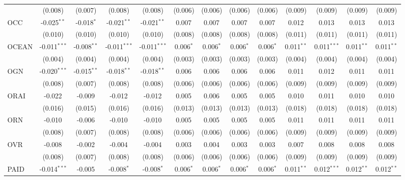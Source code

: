 \begin{table}[!htbp]
\begin{tabular}{@{\extracolsep{5pt}}lcccccccccccc}
  & (0.008) & (0.007) & (0.008) & (0.008) & (0.006) & (0.006) & (0.006) & (0.006) & (0.009) & (0.009) & (0.009) & (0.009) \\
 OCC & -0.025$^{**}$ & -0.018$^{*}$ & -0.021$^{**}$ & -0.021$^{**}$ & 0.007$^{}$ & 0.007$^{}$ & 0.007$^{}$ & 0.007$^{}$ & 0.012$^{}$ & 0.013$^{}$ & 0.013$^{}$ & 0.013$^{}$ \\
  & (0.010) & (0.010) & (0.010) & (0.010) & (0.008) & (0.008) & (0.008) & (0.008) & (0.011) & (0.011) & (0.011) & (0.011) \\
 OCEAN & -0.011$^{***}$ & -0.008$^{**}$ & -0.011$^{***}$ & -0.011$^{***}$ & 0.006$^{*}$ & 0.006$^{*}$ & 0.006$^{*}$ & 0.006$^{*}$ & 0.011$^{**}$ & 0.011$^{***}$ & 0.011$^{**}$ & 0.011$^{**}$ \\
  & (0.004) & (0.004) & (0.004) & (0.004) & (0.003) & (0.003) & (0.003) & (0.003) & (0.004) & (0.004) & (0.004) & (0.004) \\
 OGN & -0.020$^{***}$ & -0.015$^{**}$ & -0.018$^{**}$ & -0.018$^{**}$ & 0.006$^{}$ & 0.006$^{}$ & 0.006$^{}$ & 0.006$^{}$ & 0.011$^{}$ & 0.012$^{}$ & 0.011$^{}$ & 0.011$^{}$ \\
  & (0.008) & (0.007) & (0.008) & (0.008) & (0.006) & (0.006) & (0.006) & (0.006) & (0.009) & (0.009) & (0.009) & (0.009) \\
 ORAI & -0.022$^{}$ & -0.009$^{}$ & -0.012$^{}$ & -0.012$^{}$ & 0.005$^{}$ & 0.006$^{}$ & 0.005$^{}$ & 0.005$^{}$ & 0.010$^{}$ & 0.011$^{}$ & 0.010$^{}$ & 0.010$^{}$ \\
  & (0.016) & (0.015) & (0.016) & (0.016) & (0.013) & (0.013) & (0.013) & (0.013) & (0.018) & (0.018) & (0.018) & (0.018) \\
 ORN & -0.010$^{}$ & -0.006$^{}$ & -0.010$^{}$ & -0.010$^{}$ & 0.005$^{}$ & 0.005$^{}$ & 0.005$^{}$ & 0.005$^{}$ & 0.011$^{}$ & 0.011$^{}$ & 0.011$^{}$ & 0.011$^{}$ \\
  & (0.008) & (0.007) & (0.008) & (0.008) & (0.006) & (0.006) & (0.006) & (0.006) & (0.009) & (0.009) & (0.009) & (0.009) \\
 OVR & -0.008$^{}$ & -0.002$^{}$ & -0.004$^{}$ & -0.004$^{}$ & 0.003$^{}$ & 0.004$^{}$ & 0.003$^{}$ & 0.003$^{}$ & 0.007$^{}$ & 0.008$^{}$ & 0.008$^{}$ & 0.008$^{}$ \\
  & (0.008) & (0.007) & (0.008) & (0.008) & (0.006) & (0.006) & (0.006) & (0.006) & (0.009) & (0.009) & (0.009) & (0.009) \\
 PAID & -0.014$^{***}$ & -0.005$^{}$ & -0.008$^{*}$ & -0.008$^{*}$ & 0.006$^{*}$ & 0.006$^{*}$ & 0.006$^{*}$ & 0.006$^{*}$ & 0.011$^{**}$ & 0.012$^{***}$ & 0.012$^{**}$ & 0.012$^{**}$ \\

\end{tabular}
\end{table}
